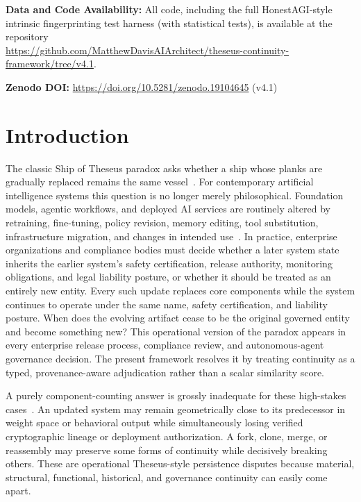 \documentclass[11pt,a4paper]{article}
\begin{document}
\noindent\textbf{Data and Code Availability:} All code, including the full HonestAGI-style intrinsic fingerprinting test harness (with statistical tests), is available at the repository \\
\url{https://github.com/MatthewDavisAIArchitect/theseus-continuity-framework/tree/v4.1}.

\noindent\textbf{Zenodo DOI:} \url{https://doi.org/10.5281/zenodo.19104645} (v4.1)

\section{Introduction}
The classic Ship of Theseus paradox asks whether a ship whose planks are gradually replaced remains the same vessel~\cite{wiggins2001}. For contemporary artificial intelligence systems this question is no longer merely philosophical. Foundation models, agentic workflows, and deployed AI services are routinely altered by retraining, fine-tuning, policy revision, memory editing, tool substitution, infrastructure migration, and changes in intended use~\cite{bommasani2021}. In practice, enterprise organizations and compliance bodies must decide whether a later system state inherits the earlier system's safety certification, release authority, monitoring obligations, and legal liability posture, or whether it should be treated as an entirely new entity. Every such update replaces core components while the system continues to operate under the same name, safety certification, and liability posture. When does the evolving artifact cease to be the original governed entity and become something new? This operational version of the paradox appears in every enterprise release process, compliance review, and autonomous-agent governance decision. The present framework resolves it by treating continuity as a typed, provenance-aware adjudication rather than a scalar similarity score.

A purely component-counting answer is grossly inadequate for these high-stakes cases~\cite{sculley2015,paleyes2022}. An updated system may remain geometrically close to its predecessor in weight space or behavioral output while simultaneously losing verified cryptographic lineage or deployment authorization. A fork, clone, merge, or reassembly may preserve some forms of continuity while decisively breaking others. These are operational Theseus-style persistence disputes because material, structural, functional, historical, and governance continuity can easily come apart.
\end{document}
